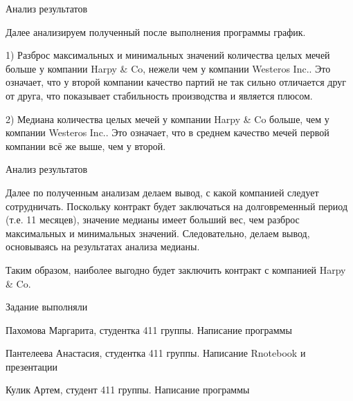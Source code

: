 \documentclass{beamer}
\begin{document}
\begin{frame}{Анализ результатов}

{\small
Далее анализируем полученный после выполнения программы график.

1) Разброс максимальных и минимальных значений количества целых мечей больше у компании Harpy & Co, нежели чем у компании Westeros Inc.. Это означает, что у второй компании качество партий не так сильно отличается друг от друга, что показывает стабильность производства и является плюсом.

2) Медиана количества целых мечей у компании Harpy & Co больше, чем у компании Westeros Inc.. Это означает, что в среднем качество мечей первой компании всё же выше, чем у второй.}

\end{frame}

\begin{frame}{Анализ результатов}

{\small
Далее по полученным анализам делаем вывод, с какой компанией следует сотрудничать.
Поскольку контракт будет заключаться на долговременный период (т.е. 11 месяцев), значение медианы имеет больший вес, чем разброс максимальных и минимальных значений. Следовательно, делаем вывод, основываясь на результатах анализа медианы.

Таким образом, наиболее выгодно будет заключить контракт с компанией Harpy & Co.}

\end{frame}

\begin{frame}{Задание выполняли}
	\begin{itemize}
		{\small
		\item Пахомова Маргарита, студентка 411 группы. Написание программы
		\item Пантелеева Анастасия, студентка 411 группы. Написание Rnotebook и презентации
		\item Кулик Артем, студент 411 группы. Написание программы}
	\end{itemize}	

\end{frame}
\end{document}
